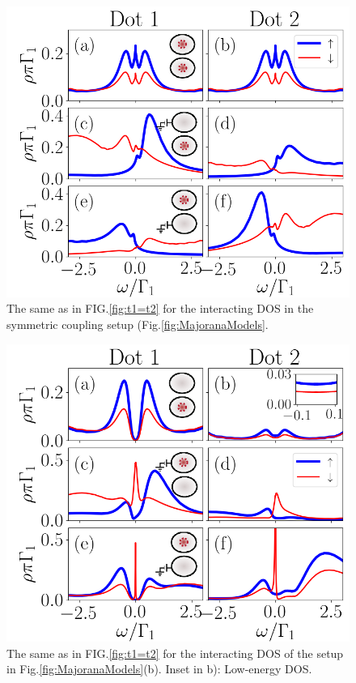 \documentclass[showpacs,aps,prb,reprint,superscriptaddress]{revtex4-1}
\begin{document}
\begin{figure}[bt]
\begin{center}
\includegraphics[scale=0.45]{Graficos/Nt1=t2.png}
\caption{ \label{fig:Nt1=t2} The same as in FIG.\ref{fig:t1=t2} for the  interacting DOS in the symmetric coupling setup (Fig.\ref{fig:MajoranaModels}.
}
%
\end{center}
\end{figure}


\begin{figure}[bt]
\begin{center}
\includegraphics[scale=0.45]{Graficos/b)Nt1>0.png}
\caption{  \label{fig:Nt1>0} The same as in FIG.\ref{fig:t1=t2} for the  interacting DOS of the setup in Fig.\ref{fig:MajoranaModels}(b). Inset in b): Low-energy DOS. 
}
%
\end{center}
\end{figure}
\end{document}

